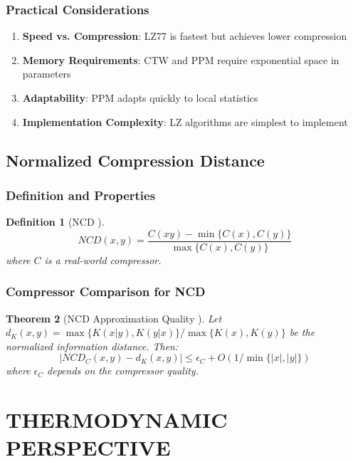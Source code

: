 \documentclass[12pt,a4paper]{report}
\newtheorem{theorem}{Theorem}[chapter]
\newtheorem{definition}[theorem]{Definition}
\begin{document}
\subsection{Practical Considerations}

\begin{enumerate}
    \item \textbf{Speed vs. Compression}: LZ77 is fastest but achieves lower compression
    \item \textbf{Memory Requirements}: CTW and PPM require exponential space in parameters
    \item \textbf{Adaptability}: PPM adapts quickly to local statistics
    \item \textbf{Implementation Complexity}: LZ algorithms are simplest to implement
\end{enumerate}

\section{Normalized Compression Distance}

\subsection{Definition and Properties}

\begin{definition}[NCD \cite{cilibrasi2005clustering}]
\begin{equation}
NCD(x,y) = \frac{C(xy) - \min\{C(x), C(y)\}}{\max\{C(x), C(y)\}}
\end{equation}
where $C$ is a real-world compressor.
\end{definition}

\subsection{Compressor Comparison for NCD}

\begin{theorem}[NCD Approximation Quality \cite{cebrianNCD2020}]
Let $d_K(x,y) = \max\{K(x|y), K(y|x)\}/\max\{K(x), K(y)\}$ be the normalized information distance. Then:
\begin{equation}
|NCD_C(x,y) - d_K(x,y)| \leq \epsilon_C + O(1/\min\{|x|, |y|\})
\end{equation}
where $\epsilon_C$ depends on the compressor quality.
\end{theorem}

\chapter{THERMODYNAMIC PERSPECTIVE}
\end{document}
